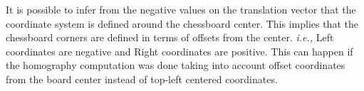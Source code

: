 \documentclass{article}
\newcounter{proofc}
\renewcommand\theproofc{(\arabic{proofc})}
\DeclareRobustCommand\stepproofc{\refstepcounter{proofc}\theproofc}
\begin{document}
It is possible to infer from the negative values on the translation vector that the coordinate system is defined around the chessboard center. This implies that the chessboard corners are defined in terms of offsets from the center. \textit{i.e.,} Left coordinates are negative and Right coordinates are positive. This can happen if the homography computation was done taking into account offset coordinates from the board center instead of top-left centered coordinates.













\newpage
\nocite{*}
\printbibliography



\end{document}
